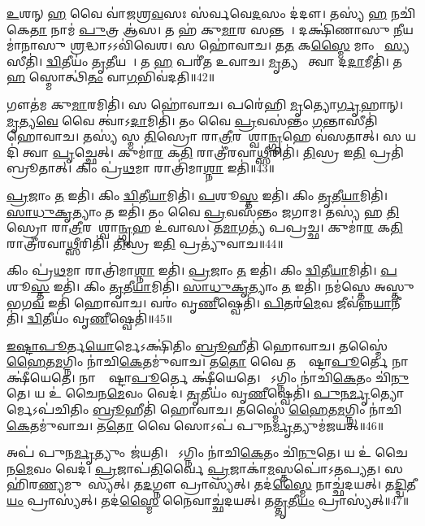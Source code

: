    \ul{𑌉}𑌶𑌨𑍍 \ul{𑌹} 𑌵𑍈 𑌵𑌾॑𑌜𑌶𑍍𑌰\ul{𑌵}𑌸𑌃 𑌸॑𑌰𑍍𑌵𑌵𑍇\ul{𑌦}𑌸𑌂 𑌦॑𑌦𑍗।
   𑌤𑌸𑍍𑌯॑ \ul{𑌹} 𑌨𑌚𑌿॑𑌕𑍇\ul{𑌤𑌾} 𑌨𑌾𑌮॑ \ul{𑌪𑍁}𑌤𑍍𑌰 𑌆॑𑌸।
   𑌤 𑌹॑ 𑌕𑍁\ul{𑌮𑌾}𑌰 𑌸𑌨𑍍𑌤𑌮𑍍᳚।
   𑌦𑌕𑍍𑌷𑌿॑𑌣𑌾𑌸𑍁 \ul{𑌨𑍀}𑌯𑌮𑌾॑𑌨𑌾𑌸𑍁 \ul{𑌶𑍍𑌰}𑌦𑍍𑌧𑌾𑌽𑌽𑌵𑌿॑𑌵𑍇𑌶।
   𑌸 𑌹𑍋॑𑌵𑌾𑌚।
   𑌤\ul{𑌤} 𑌕\ul{𑌸𑍍𑌮𑍈} 𑌮𑌾𑌂 𑌦𑌾᳚\ul{𑌸𑍍𑌯}𑌸𑍀𑌤𑌿॑।
   \ul{𑌦𑍍𑌵𑌿}𑌤𑍀𑌯𑌂॑ \ul{𑌤𑍃}𑌤𑍀𑌯𑌮𑍍᳚।
   𑌤 \ul{𑌹} 𑌪𑌰𑍀॑𑌤 𑌉𑌵𑌾𑌚।
   \ul{𑌮𑍃}𑌤𑍍𑌯𑌵𑍇᳚ 𑌤𑍍𑌵𑌾 𑌦\ul{𑌦𑌾}𑌮𑍀𑌤𑌿॑।
   𑌤 \ul{𑌹} 𑌸𑍍𑌮𑍋𑌤𑍍𑌥𑌿॑\ul{𑌤𑌂} 𑌵𑌾\ul{𑌗}𑌭𑌿𑌵॑𑌦𑌤𑌿॥42॥

   𑌗𑍗𑌤॑𑌮 𑌕𑍁\ul{𑌮𑌾}𑌰𑌮𑌿𑌤𑌿॑।
   𑌸 𑌹𑍋॑𑌵𑌾𑌚।
   𑌪𑌰𑍇॑𑌹𑌿 \ul{𑌮𑍃}𑌤𑍍𑌯𑍋\ul{𑌰𑍍𑌗𑍃}𑌹𑌾𑌨𑍍।
   \ul{𑌮𑍃}𑌤𑍍𑌯\ul{𑌵𑍇} 𑌵𑍈 𑌤𑍍𑌵𑌾॑𑌽\ul{𑌦𑌾}𑌮𑌿𑌤𑌿॑।
   𑌤𑌂 𑌵𑍈 \ul{𑌪𑍍𑌰}𑌵𑌸॑𑌨𑍍𑌤𑌂 \ul{𑌗}𑌨𑍍𑌤𑌾𑌸𑍀𑌤𑌿॑ 𑌹𑍋𑌵𑌾𑌚।
   𑌤𑌸𑍍𑌯॑ 𑌸𑍍𑌮 \ul{𑌤𑌿}𑌸𑍍𑌰𑍋 𑌰𑌾\ul{𑌤𑍍𑌰𑍀}𑌰𑌨𑌾᳚𑌶𑍍𑌵𑌾\ul{𑌨𑍍𑌗𑍃}𑌹𑍇 𑌵॑𑌸𑌤𑌾𑌤𑍍।
   𑌸 𑌯𑌦𑌿॑ 𑌤𑍍𑌵𑌾 \ul{𑌪𑍃}𑌚𑍍𑌛𑍇𑌤𑍍।
   𑌕𑍁𑌮𑌾॑\ul{𑌰} 𑌕\ul{𑌤𑌿} 𑌰𑌾𑌤𑍍𑌰𑍀॑𑌰𑌵𑌾\ul{𑌥𑍍𑌸𑍀}𑌰𑌿𑌤𑌿॑।
   \ul{𑌤𑌿}𑌸𑍍𑌰 𑌇\ul{𑌤𑌿} 𑌪𑍍𑌰𑌤𑌿॑𑌬𑍍𑌰𑍂𑌤𑌾𑌤𑍍।
   𑌕𑌿𑌂 𑌪𑍍𑌰॑\ul{𑌥}𑌮𑌾 𑌰𑌾𑌤𑍍𑌰𑌿॑𑌮𑌾\ul{𑌶𑍍𑌨𑌾} 𑌇𑌤𑌿॑॥43॥

   \ul{𑌪𑍍𑌰}𑌜𑌾𑌂 \ul{𑌤} 𑌇𑌤𑌿॑।
   𑌕𑌿𑌂 \ul{𑌦𑍍𑌵𑌿}𑌤𑍀\ul{𑌯𑌾}𑌮𑌿𑌤𑌿॑।
   \ul{𑌪}𑌶𑍂\ul{𑌸𑍍𑌤} 𑌇𑌤𑌿॑।
   𑌕𑌿𑌂 \ul{𑌤𑍃}𑌤𑍀\ul{𑌯𑌾}𑌮𑌿𑌤𑌿॑।
   \ul{𑌸𑌾}\ul{𑌧𑍁}\ul{𑌕𑍃}𑌤𑍍𑌯𑌾𑌂 \ul{𑌤} 𑌇𑌤𑌿॑।
   𑌤𑌂 𑌵𑍈 \ul{𑌪𑍍𑌰}𑌵𑌸॑𑌨𑍍𑌤𑌂 𑌜𑌗𑌾𑌮।
   𑌤𑌸𑍍𑌯॑ 𑌹 \ul{𑌤𑌿}𑌸𑍍𑌰𑍋 𑌰𑌾\ul{𑌤𑍍𑌰𑍀}𑌰𑌨𑌾᳚𑌶𑍍𑌵𑌾\ul{𑌨𑍍𑌗𑍃}𑌹 𑌉॑𑌵𑌾𑌸।
   𑌤\ul{𑌮𑌾}𑌗𑌤𑍍𑌯॑ 𑌪𑌪𑍍𑌰𑌚𑍍𑌛।
   𑌕𑍁𑌮𑌾॑\ul{𑌰} 𑌕\ul{𑌤𑌿} 𑌰𑌾𑌤𑍍𑌰𑍀॑𑌰𑌵𑌾\ul{𑌥𑍍𑌸𑍀}𑌰𑌿𑌤𑌿॑।
   \ul{𑌤𑌿}𑌸𑍍𑌰 𑌇\ul{𑌤𑌿} 𑌪𑍍𑌰𑌤𑍍𑌯𑍁॑𑌵𑌾𑌚॥44॥

   𑌕𑌿𑌂 𑌪𑍍𑌰॑\ul{𑌥}𑌮𑌾 𑌰𑌾𑌤𑍍𑌰𑌿॑𑌮𑌾\ul{𑌶𑍍𑌨𑌾} 𑌇𑌤𑌿॑।
   \ul{𑌪𑍍𑌰}𑌜𑌾𑌂 \ul{𑌤} 𑌇𑌤𑌿॑।
   𑌕𑌿𑌂 \ul{𑌦𑍍𑌵𑌿}𑌤𑍀\ul{𑌯𑌾}𑌮𑌿𑌤𑌿॑।
   \ul{𑌪}𑌶𑍂\ul{𑌸𑍍𑌤} 𑌇𑌤𑌿॑।
   𑌕𑌿𑌂 \ul{𑌤𑍃}𑌤𑍀\ul{𑌯𑌾}𑌮𑌿𑌤𑌿॑।
   \ul{𑌸𑌾}\ul{𑌧𑍁}\ul{𑌕𑍃}𑌤𑍍𑌯𑌾𑌂 \ul{𑌤} 𑌇𑌤𑌿॑।
   𑌨𑌮॑𑌸𑍍𑌤𑍇 𑌅𑌸𑍍𑌤𑍁 𑌭𑌗\ul{𑌵} 𑌇𑌤𑌿॑ 𑌹𑍋𑌵𑌾𑌚।
   𑌵𑌰𑌂॑ 𑌵𑍃\ul{𑌣𑍀}𑌷𑍍𑌵𑍇𑌤𑌿॑।
   \ul{𑌪𑌿}𑌤𑌰॑\ul{𑌮𑍇}𑌵 𑌜𑍀𑌵॑𑌨𑍍𑌨\ul{𑌯𑌾}𑌨𑍀𑌤𑌿॑।
   \ul{𑌦𑍍𑌵𑌿}𑌤𑍀𑌯𑌂॑ 𑌵𑍃\ul{𑌣𑍀}𑌷𑍍𑌵𑍇𑌤𑌿॑॥45॥

   \ul{𑌇}\ul{𑌷𑍍𑌟𑌾}\ul{𑌪𑍂}𑌰𑍍𑌤\ul{𑌯𑍋}𑌰𑍍𑌮𑍇𑌽𑌕𑍍𑌷𑌿॑𑌤𑌿𑌂 \ul{𑌬𑍍𑌰𑍂}𑌹𑍀𑌤𑌿॑ 𑌹𑍋𑌵𑌾𑌚।
   𑌤𑌸𑍍𑌮𑍈॑ \ul{𑌹𑍈}𑌤\ul{𑌮}𑌗𑍍𑌨𑌿𑌂 𑌨𑌾॑𑌚𑌿\ul{𑌕𑍇}𑌤𑌮𑍁॑𑌵𑌾𑌚।
   𑌤\ul{𑌤𑍋} 𑌵𑍈 𑌤𑌸𑍍𑌯𑍇᳚𑌷𑍍𑌟𑌾\ul{𑌪𑍂}𑌰𑍍𑌤𑍇 𑌨𑌾 𑌕𑍍𑌷𑍀॑𑌯𑍇𑌤𑍇।
   𑌨𑌾𑌸𑍍𑌯𑍇᳚𑌷𑍍𑌟𑌾\ul{𑌪𑍂}𑌰𑍍𑌤𑍇 𑌕𑍍𑌷𑍀॑𑌯𑍇𑌤𑍇।
   𑌯𑍋᳚𑌽𑌗𑍍𑌨𑌿𑌂 𑌨𑌾॑𑌚𑌿\ul{𑌕𑍇}𑌤𑌂 𑌚𑌿॑\ul{𑌨𑍁}𑌤𑍇।
   𑌯 𑌉॑ 𑌚𑍈𑌨\ul{𑌮𑍇}𑌵𑌂 𑌵𑍇𑌦॑।
   \ul{𑌤𑍃}𑌤𑍀𑌯𑌂॑ 𑌵𑍃\ul{𑌣𑍀}𑌷𑍍𑌵𑍇𑌤𑌿॑।
   \ul{𑌪𑍁}\ul{𑌨}\ul{𑌰𑍍𑌮𑍃}𑌤𑍍𑌯𑍋𑌰𑍍𑌮𑍇𑌽𑌪॑𑌚𑌿𑌤𑌿𑌂 \ul{𑌬𑍍𑌰𑍂}𑌹𑍀𑌤𑌿॑ 𑌹𑍋𑌵𑌾𑌚।
   𑌤𑌸𑍍𑌮𑍈॑ \ul{𑌹𑍈}𑌤\ul{𑌮}𑌗𑍍𑌨𑌿𑌂 𑌨𑌾॑𑌚𑌿\ul{𑌕𑍇}𑌤𑌮𑍁॑𑌵𑌾𑌚।
   𑌤\ul{𑌤𑍋} 𑌵𑍈 𑌸𑍋𑌽𑌪॑ 𑌪𑍁𑌨\ul{𑌰𑍍𑌮𑍃}𑌤𑍍𑌯𑍁𑌮॑𑌜𑌯𑌤𑍍॥46॥

   𑌅𑌪॑ 𑌪𑍁𑌨\ul{𑌰𑍍𑌮𑍃}𑌤𑍍𑌯𑍁𑌂 𑌜॑𑌯𑌤𑌿।
   𑌯𑍋᳚𑌽𑌗𑍍𑌨𑌿𑌂 𑌨𑌾॑𑌚𑌿\ul{𑌕𑍇}𑌤𑌂 𑌚𑌿॑\ul{𑌨𑍁}𑌤𑍇।
   𑌯 𑌉॑ 𑌚𑍈𑌨\ul{𑌮𑍇}𑌵𑌂 𑌵𑍇𑌦॑।
   \ul{𑌪𑍍𑌰}𑌜𑌾𑌪॑\ul{𑌤𑌿}𑌰𑍍𑌵𑍈 \ul{𑌪𑍍𑌰}𑌜𑌾𑌕𑌾॑\ul{𑌮}𑌸𑍍𑌤𑌪𑍋॑𑌽𑌤𑌪𑍍𑌯𑌤।
   𑌸 𑌹𑌿॑𑌰\ul{𑌣𑍍𑌯}𑌮𑍁𑌦𑌾᳚𑌸𑍍𑌯𑌤𑍍।
   𑌤\ul{𑌦}𑌗𑍍𑌨𑍗 𑌪𑍍𑌰𑌾𑌸𑍍𑌯॑𑌤𑍍।
   𑌤𑌦॑\ul{𑌸𑍍𑌮𑍈} 𑌨𑌾𑌚𑍍𑌛॑𑌦𑌯𑌤𑍍।
   𑌤\ul{𑌦𑍍𑌦𑍍𑌵𑌿}𑌤𑍀\ul{𑌯𑌂} 𑌪𑍍𑌰𑌾𑌸𑍍𑌯॑𑌤𑍍।
   𑌤𑌦॑\ul{𑌸𑍍𑌮𑍈} 𑌨𑍈𑌵𑌾𑌚𑍍𑌛॑𑌦𑌯𑌤𑍍।
   𑌤\ul{𑌤𑍍𑌤𑍃}𑌤𑍀\ul{𑌯𑌂} 𑌪𑍍𑌰𑌾𑌸𑍍𑌯॑𑌤𑍍॥47॥

